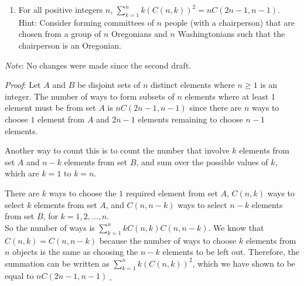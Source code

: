 \documentclass[12pt]{amsart}
\theoremstyle{definition}
\theoremstyle{remark}
\begin{document}
\begin{enumerate}
\newpage

\item For all positive integers $n$, $\displaystyle \sum_{k=1}^n k(C(n,k))^2=n C(2n-1,n-1)$.\\

Hint:  Consider forming committees of $n$ people (with a chairperson) that are chosen from a group of $n$ Oregonians and $n$ Washingtonians such that the chairperson is an Oregonian.

\end{enumerate}

\bigskip
\bigskip

\emph{Note}: No changes were made since the second draft.

\emph{Proof}: Let $A$ and $B$ be disjoint sets of $n$ distinct elements where $n\geq 1$ is an integer.
The number of ways to form subsets of $n$ elements where at least $1$ element must be from set $A$ is $nC(2n-1,n-1)$ since there are $n$ ways to choose $1$ element from $A$ and $2n-1$ elements remaining to choose $n-1$ elements.

Another way to count this is to count the number that involve $k$ elements from set $A$ and $n-k$ elements from set $B$, and sum over the possible values of $k$, which are $k=1$ to $k=n$.

There are $k$ ways to choose the $1$ required element from set $A$, $C(n, k)$ ways to select $k$ elements from set $A$, and $C(n, n-k)$ ways to select $n-k$ elements from set $B$, for $k=1, 2,..., n$. \\
So the number of ways is $\displaystyle \sum_{k=1}^n kC(n,k)C(n, n-k)$.
We know that $C(n,k)=C(n,n-k)$ because the number of ways to choose $k$ elements from $n$ objects is the same as choosing the $n-k$ elements to be left out.
Therefore, the summation can be written as $\displaystyle \sum_{k=1}^n k(C(n,k))^2$, which we have shown to be equal to $\displaystyle nC(2n-1,n-1)\;_{\square}$ \\
\end{document}
